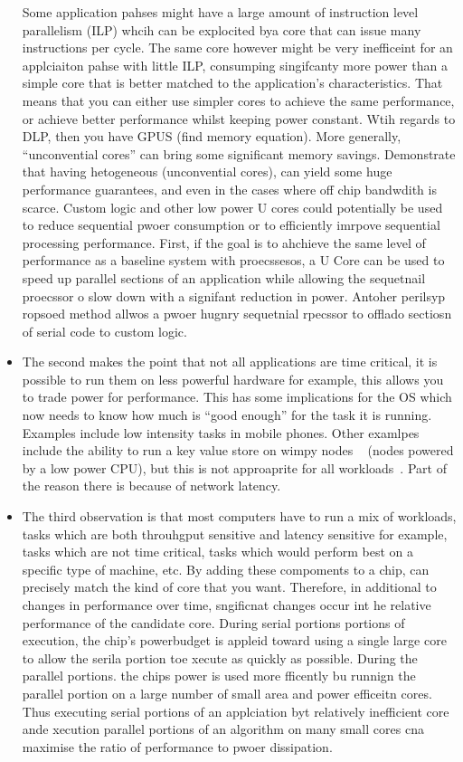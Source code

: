 \begin{itemize}
Some application pahses might have a large amount of instruction level parallelism (ILP) whcih can be explocited bya core that can issue many instructions per cycle. The same core however might be very inefficeint for an applciaiton pahse with little ILP, consumping singifcanty more power than a simple core that is better matched to the application's characteristics. 
That means that you can either use simpler
cores to achieve the same performance, or achieve better performance whilst
keeping power constant. Wtih regards to DLP, then you have GPUS
(find memory equation). More generally, ``unconvential cores'' can
bring some significant memory savings. Demonstrate that having hetogeneous
(unconvential cores), can yield some huge performance guarantees, and 
even in the cases where off chip bandwdith is scarce. 
Custom logic and other low power U cores could potentially be used to
reduce sequential pwoer consumption or to efficiently 
imrpove sequential processing performance. First, if the goal is to ahchieve the same level of performance as a baseline system with proecssesos, a U Core can be used to speed up parallel sections of an application while allowing the sequetnail proecssor o slow down with a signifant reduction in power. Antoher perilsyp ropsoed method allwos a pwoer hugnry sequetnial rpecssor to offlado sectiosn of serial code to custom logic. 
\item The second makes the point that not all applications
are time critical, it is possible to run them on 
less powerful hardware for example, this allows you to trade
power for performance. This has some implications for the OS
which now needs to know how much is ``good enough'' for the 
task it is running. Examples include low intensity 
tasks in mobile phones. Other examlpes include the ability 
to run a key value store on wimpy nodes ~\cite{andersen2009fawn} (nodes powered
by a low power CPU), but this is not approaprite for all workloads~\cite{lang2010nonwimpy}.
Part of the reason there is because of network latency. 
\item The third observation is that most computers have to run 
a mix of workloads, tasks which are both throuhgput sensitive
and latency sensitive for example, tasks which are not time critical,
tasks which would perform best on a specific type of machine, etc. 
By adding these compoments to a chip, can precisely match the kind of 
core that you want. 
Therefore, in additional to changes in performance over time, sngificnat changes occur int he relative performance of the candidate core.  During serial portions  portions of execution, the chip's powerbudget is appleid toward using a single large core to allow the serila portion toe xecute as quickly as possible. 
During the parallel portions. the chips power is used more fficently bu runnign the parallel portion on a large number of small area and power efficeitn cores. Thus executing serial portions of an applciation byt relatively inefficient core ande xecution parallel portions of an algorithm on many small cores cna maximise the ratio 
of performance to pwoer dissipation. 


\end{itemize}
